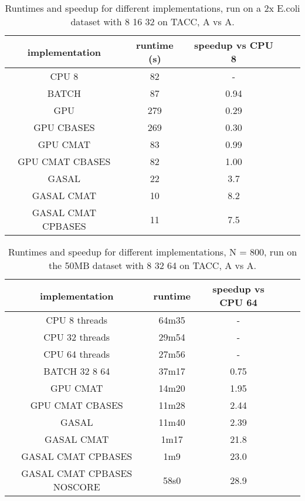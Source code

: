 \documentclass[../thesis.tex]{subfiles}
\begin{document}

\begin{table}
\centering
\caption{Runtimes and speedup for different implementations, run on a 2x E.coli dataset with 8 16 32 on TACC, A vs A.}
\label{tbl:darwin1}
\begin{tabular}{c c c c c}
implementation & runtime (s) & speedup vs CPU 8 \\ \hline
CPU 8 & 82 & -\\
BATCH & 87 & 0.94 \\
GPU & 279 & 0.29 \\
GPU CBASES & 269 & 0.30 \\
GPU CMAT & 83 & 0.99 \\
GPU CMAT CBASES & 82 & 1.00 \\
GASAL & 22 & 3.7 \\
GASAL CMAT & 10 & 8.2 \\
GASAL CMAT CPBASES & 11 & 7.5 \\
\end{tabular}
\end{table}

\begin{table}
\centering
\caption{Runtimes and speedup for different implementations, N = 800, run on the 50MB dataset with 8 32 64 on TACC, A vs A.}
\label{tbl:darwin2}
\begin{tabular}{c c c c c}
implementation & runtime & speedup vs CPU 64 \\ \hline
CPU 8 threads & 64m35 & - \\
CPU 32 threads & 29m54 & - \\
CPU 64 threads & 27m56 & - \\
BATCH 32 8 64 & 37m17 & 0.75 \\
GPU CMAT & 14m20 & 1.95 \\
GPU CMAT CBASES & 11m28 & 2.44 \\
GASAL & 11m40 & 2.39 \\
GASAL CMAT & 1m17 & 21.8 \\
GASAL CMAT CPBASES & 1m9 & 23.0 \\
GASAL CMAT CPBASES NOSCORE & 58s0 & 28.9 \\
\end{tabular}
\end{table}

\end{document}
